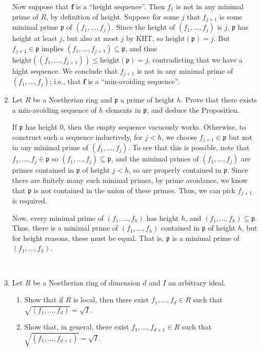 \documentclass[12pt]{amsart}
\newcommand{\Bold}[1]{\contour{black}{#1}}
\newcommand{\p}{\mathfrak{p}}
\newcommand{\hgt}{\mathrm{height}}
\renewcommand{\1}{\mathbbm{1}}
\newcommand{\solution}[1]{\ifthenelse {\equal{\displaysol}{1}} {\begin{framed}{\color{meretale}\noindent #1}\end{framed}} { \ }}
\newcommand\itemA{\stepcounter{enumi}\item[{\Bold{(\theenumi)}}]}
\newcommand\itemB{\stepcounter{enumi}\item[(\theenumi)]}
\begin{document}
\begin{enumerate}
{Now suppose that  $\mathbf{f}$ is a ``height sequence''. Then $f_1$ is not in any minimal prime of $R$, by definition of height. Suppose for some $j$ that $f_{j+1}$ is some minimal prime $\p$ of $(f_1,\dots,f_j)$. Since the height of $(f_1,\dots,f_j)$ is $j$, $\p$ has height at least $j$, but also at most $j$ by KHT, so $\hgt(\p)=j$. But $f_{j+1} \in \p$ implies  $(f_1,\dots,f_{j+1}) \subseteq \p$, and thus $\hgt((f_1,\dots,f_{j+1}))\leq \hgt(\p) = j$, contradicting that we have a hight sequence. We conclude that $f_{j+1}$ is not in any minimal prime of $(f_1,\dots,f_j)$; i.e., that  $\mathbf{f}$ is a ``min-avoiding sequence''.
}

\itemA Let $R$ be a Noetherian ring and $\p$ a prime of height $h$. Prove that there exists a min-avoiding sequence of $h$ elements in $\p$, and deduce the Proposition.

\solution{If $\p$ has height $0$, then the empty sequence vacuously works. Otherwise, to construct such a sequence inductively, for $j<h$, we choose $f_{j+1} \in \p$ but not in any minimal prime of $(f_{1},\dots,f_{j})$. To see that this is possible, note that $f_1,\dots,f_j\in \p$ so $(f_{1},\dots,f_{j}) \subseteq \p$, and the minimal primes of $(f_{1},\dots,f_{j})$ are primes contained in $\p$ of height $j<h$, so are properly contained in $\p$. Since there are finitely many such minimal primes, by prime avoidance, we know that $\p$ is not contained in the union of these primes. Thus, we can pick $f_{j+1}$ is required.

Now, every minimal prime of $(f_1,\dots,f_h)$ has height $h$, and $(f_1,\dots,f_h) \subseteq \p$. Thus, there is a minimal prime of $(f_1,\dots,f_h)$ contained in $\p$ of height $h$, but for height reasons, these must be equal. That is, $\p$ is a minimal prime of $(f_1,\dots,f_h)$.}



\itemB Let $R$ be a Noetherian ring of dimension $d$ and $I$ an arbitrary ideal.
\begin{enumerate}
\item Show that if $R$ is local, then there exist $f_1,\dots,f_d\in R$ such that $\sqrt{(f_1,\dots,f_{d})} = \sqrt{I}$.
\item Show that, in general, there exist $f_1,\dots,f_{d+1}\in R$ such that $\sqrt{(f_1,\dots,f_{d+1})} = \sqrt{I}$.
\end{enumerate}

\end{enumerate}
\end{document}

